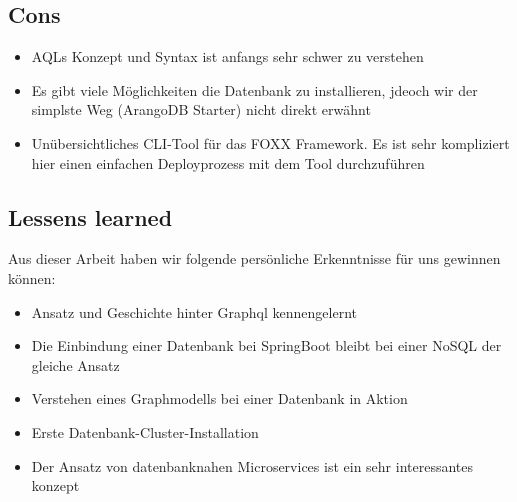 \subsection{Cons}
\begin{itemize}
\item \ac{AQL}s Konzept und Syntax ist anfangs sehr schwer zu verstehen
\item Es gibt viele Möglichkeiten die Datenbank zu installieren, jdeoch wir der simplste Weg (ArangoDB Starter) nicht direkt erwähnt
\item Unübersichtliches \ac{CLI}-Tool für das FOXX Framework. Es ist sehr kompliziert hier einen einfachen Deployprozess mit dem Tool  durchzuführen
\end{itemize}
\subsection{Lessens learned}
Aus dieser Arbeit haben wir folgende persönliche Erkenntnisse für uns gewinnen können:
\begin{itemize}
\item Ansatz und Geschichte hinter Graphql kennengelernt
\item Die Einbindung einer Datenbank bei SpringBoot bleibt bei einer \ac{NoSQL} der gleiche Ansatz
\item Verstehen eines Graphmodells bei einer Datenbank in Aktion
\item Erste Datenbank-Cluster-Installation
\item Der Ansatz von datenbanknahen Microservices ist ein sehr interessantes konzept
\end{itemize}
